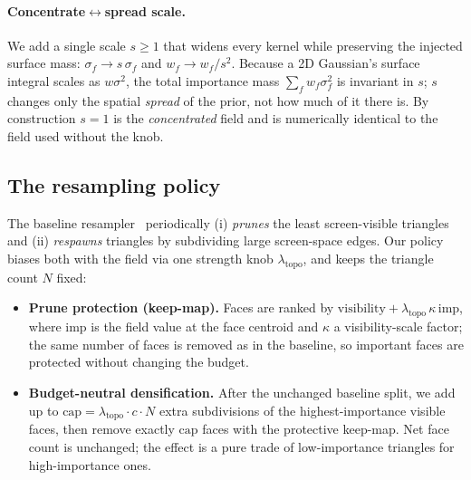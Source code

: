 \paragraph{Concentrate$\leftrightarrow$spread scale.}
We add a single scale $s\!\ge\!1$ that widens every kernel while preserving the
injected surface mass: $\sigma_f \to s\,\sigma_f$ and
$w_f \to w_f/s^2$. Because a 2D Gaussian's surface integral scales as
$w\sigma^2$, the total importance mass $\sum_f w_f\sigma_f^2$ is invariant in $s$;
$s$ changes only the spatial \emph{spread} of the prior, not how much of it there
is. By construction $s\!=\!1$ is the \emph{concentrated} field and is numerically
identical to the field used without the knob.

\subsection{The resampling policy}
\label{sec:method-policy}
The baseline resampler~\cite{tojo2026diffsoup} periodically (i) \emph{prunes} the least screen-visible
triangles and (ii) \emph{respawns} triangles by subdividing large screen-space
edges. Our policy biases both with the field via one strength knob
$\lambda_{\text{topo}}$, and keeps the triangle count $N$ fixed:

\begin{itemize}
  \item \textbf{Prune protection (keep-map).} Faces are ranked by
  $\text{visibility} + \lambda_{\text{topo}}\,\kappa\,\mathrm{imp}$, where
  $\mathrm{imp}$ is the field value at the face centroid and $\kappa$ a
  visibility-scale factor; the same number of faces is removed as in the baseline,
  so important faces are protected without changing the budget.
  \item \textbf{Budget-neutral densification.} After the unchanged baseline split,
  we add up to $\mathrm{cap}=\lambda_{\text{topo}}\!\cdot\!c\!\cdot\!N$ extra
  subdivisions of the highest-importance visible faces, then remove exactly
  $\mathrm{cap}$ faces with the protective keep-map. Net face count is unchanged;
  the effect is a pure trade of low-importance triangles for high-importance ones.
\end{itemize}

